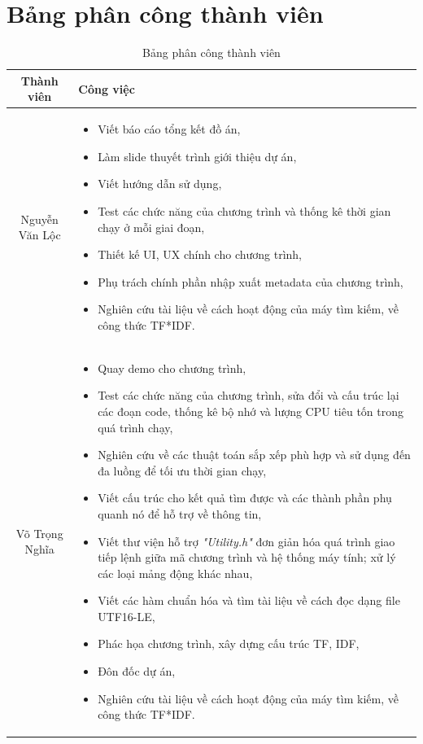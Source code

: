 \documentclass[12pt,a4paper]{article}
\begin{document}
\section*{Bảng phân công thành viên}
\begin{table}[H]
\begin{tabular}{|c|p{}|}
\hline 
Thành viên & Công việc \\ 
\hline 
Nguyễn Văn Lộc & \begin{itemize}
\item Viết báo cáo tổng kết đồ án, 
\item Làm slide thuyết trình giới thiệu dự án,
\item Viết hướng dẫn sử dụng,
\item Test các chức năng của chương trình và thống kê thời gian chạy ở mỗi giai đoạn,
\item Thiết kế UI, UX chính cho chương trình,
\item Phụ trách chính phần nhập xuất metadata của chương trình,
\item Nghiên cứu tài liệu về cách hoạt động của máy tìm kiếm, về công thức TF*IDF.
\end{itemize}
 \\ 
\hline 
Võ Trọng Nghĩa & \begin{itemize}
\item Quay demo cho chương trình,
\item Test các chức năng của chương trình, sửa đổi và cấu trúc lại các đoạn code, thống kê bộ nhớ và lượng CPU tiêu tốn trong quá trình chạy,
\item Nghiên cứu về các thuật toán sắp xếp phù hợp và sử dụng đến đa luồng để tối ưu thời gian chạy,
\item Viết cấu trúc cho kết quả tìm được và các thành phần phụ quanh nó để hỗ trợ về thông tin,
\item Viết thư viện hỗ trợ \textit{"Utility.h"} đơn giản hóa quá trình giao tiếp lệnh giữa mã chương trình và hệ thống máy tính; xử lý các loại mảng động khác nhau,
\item Viết các hàm chuẩn hóa và tìm tài liệu về cách đọc dạng file UTF16-LE,
\item Phác họa chương trình, xây dựng cấu trúc TF, IDF,
\item Đôn đốc dự án,
\item Nghiên cứu tài liệu về cách hoạt động của máy tìm kiếm, về công thức TF*IDF.
\end{itemize} \\ 
\hline 
\end{tabular}
\caption{Bảng phân công thành viên}
\label{tab1} 
\end{table}
\newpage
\end{document}
